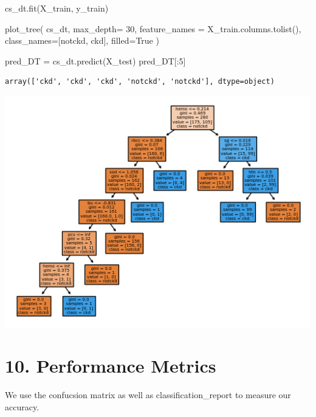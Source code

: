 \documentclass[
  11pt,
  letterpaper,
  DIV=11,
  numbers=noendperiod]{scrartcl}
\newenvironment{Shaded}{\begin{snugshade}}{\end{snugshade}}
\newcommand{\DecValTok}[1]{\textcolor[rgb]{0.68,0.00,0.00}{#1}}
\newcommand{\NormalTok}[1]{\textcolor[rgb]{0.00,0.23,0.31}{#1}}
\newcommand{\OperatorTok}[1]{\textcolor[rgb]{0.37,0.37,0.37}{#1}}
\newcommand{\StringTok}[1]{\textcolor[rgb]{0.13,0.47,0.30}{#1}}
\newcommand{\VariableTok}[1]{\textcolor[rgb]{0.07,0.07,0.07}{#1}}
\begin{document}
\begin{Shaded}
\begin{Highlighting}[]
\NormalTok{cs\_dt.fit(X\_train, y\_train)}

\NormalTok{plot\_tree(}
\NormalTok{    cs\_dt, }
\NormalTok{    max\_depth}\OperatorTok{=} \DecValTok{30}\NormalTok{, }
\NormalTok{    feature\_names }\OperatorTok{=}\NormalTok{ X\_train.columns.tolist(), }
\NormalTok{    class\_names}\OperatorTok{=}\NormalTok{[}\StringTok{\textquotesingle{}notckd\textquotesingle{}}\NormalTok{, }\StringTok{\textquotesingle{}ckd\textquotesingle{}}\NormalTok{],}
\NormalTok{    filled}\OperatorTok{=}\VariableTok{True}
\NormalTok{)}

\NormalTok{pred\_DT }\OperatorTok{=}\NormalTok{ cs\_dt.predict(X\_test)}
\NormalTok{pred\_DT[:}\DecValTok{5}\NormalTok{]}

\end{Highlighting}
\end{Shaded}

\begin{verbatim}
array(['ckd', 'ckd', 'ckd', 'notckd', 'notckd'], dtype=object)
\end{verbatim}

\includegraphics{Assignment6_Final version_files/figure-pdf/cell-26-output-2.png}

\section{10. Performance Metrics}\label{performance-metrics}

We use the confucsion matrix as well as classification\_report to
measure our accuracy.
\end{document}
